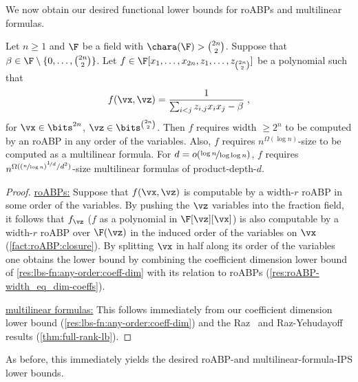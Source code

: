 \documentclass{toc}
\begin{document}
We now obtain our desired functional lower bounds for roABPs and multilinear formulas.

\begin{corollary}\label{res:lbs-fn:any-order}
        Let $n\ge 1$ and $\F$ be a field with $\chara(\F)>\binom{2n}{2}$.  Suppose that $\beta\in\F\setminus\{0,\ldots,\binom{2n}{2}\}$.  Let $f\in\F[x_1,\ldots,x_{2n},z_1,\ldots,z_{\binom{2n}{2}}]$ be a polynomial such that
        \[
                f(\vx,\vz)=\frac{1}{\sum_{i<j} z_{i,j}x_ix_j-\beta}
                \;,
        \]
        for $\vx\in\bits^{2n}$, $\vz\in\bits^{\binom{2n}{2}}$. Then $f$ requires width $\ge 2^n$ to be computed by an roABP in any order of the variables.  Also, $f$ requires $n^{\Omega(\log n)}$-size to be computed as a multilinear formula.  For $d=o(\nicefrac{\log n}{\log\log n})$, $f$ requires $n^{\Omega((\nicefrac{n}{\log n})^{\nicefrac{1}{d}}/d^2)}$-size multilinear formulas of product-depth-$d$.
\end{corollary}
\begin{proof}
        \uline{roABPs:}  Suppose that $f(\vx,\vz)$ is computable by a width-$r$ roABP in some order of the variables.  By pushing the $\vz$ variables into the fraction field, it follows that $f_\vz$ ($f$ as a polynomial in $\F[\vz][\vx]$) is also computable by a width-$r$ roABP over $\F(\vz)$ in the induced order of the variables on $\vx$ (\autoref{fact:roABP:closure}).  By splitting $\vx$ in half along its order of the variables one obtains the lower bound by combining the coefficient dimension lower bound of \autoref{res:lbs-fn:any-order:coeff-dim} with its relation to roABPs (\autoref{res:roABP-width_eq_dim-coeffs}).

        \uline{multilinear formulas:} This follows immediately from our coefficient dimension lower bound (\autoref{res:lbs-fn:any-order:coeff-dim}) and the Raz~\cite{Raz09} and Raz-Yehudayoff~\cite{RazYehudayoff09} results (\autoref{thm:full-rank-lb}).
\end{proof}

As before, this immediately yields the desired roABP-\lIPS and multilinear-formula-IPS lower bounds.
\end{document}
